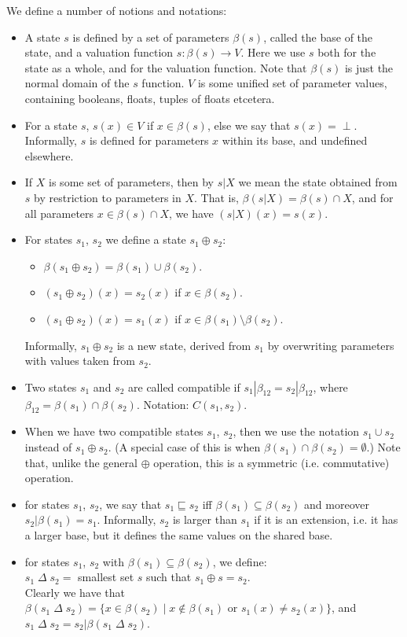 \documentclass[10pt, fleqn]{report}
\begin{document}
 We define a number of notions and notations:
 \begin{itemize}
 \item A state $s$ is defined by a set of parameters $\beta(s)$, called the base of the state,
 and a valuation function $s: \beta(s) \rightarrow V$. Here we use $s$ both for the state as a whole, and for the valuation function. Note that $\beta(s)$ is just the normal domain of the $s$ function.
  $V$ is some unified set of parameter values, containing booleans, floats, tuples of floats etcetera.
  \item For a state $s$, $s(x) \in V$ if $x\in\beta(s)$, else we say that $s(x) = \perp$.
  Informally, $s$ is defined for parameters $x$ within its base, and undefined elsewhere.
  \item If $X$ is some set of parameters, then by $s|X$ we mean the state obtained from $s$ by restriction to parameters in $X$. That is, $\beta(s|X) = \beta(s)\cap X$, and for all
      parameters $x\in \beta(s)\cap X$, we have $(s|X)(x) = s(x)$.
  \item For states $s_1$, $s_2$ we define a state $s_1\oplus s_2$:
  \begin{itemize}
  \item $\beta(s_1\oplus s_2) = \beta(s_1) \cup \beta(s_2)$.
  \item $(s_1\oplus s_2)(x) = s_2(x)$ if $x\in \beta(s_2)$.
  \item $(s_1\oplus s_2)(x) = s_1(x)$ if $x\in \beta(s_1)\setminus \beta(s_2)$.
  \end{itemize}
  Informally, $s_1\oplus s_2$ is a new state, derived from $s_1$ by overwriting parameters
  with values taken from $s_2$.
  \item Two states $s_1$ and $s_2$ are called compatible if $s_1|\beta_{12} = s_2|\beta_{12}$,
  where $\beta_{12} = \beta(s_1)\cap\beta(s_2)$. Notation: $C(s_1,s_2)$.
  \item When we have two compatible states $s_1$, $s_2$,
  then we use the notation $s_1\cup s_2$ instead of $s_1\oplus s_2$.
  (A special case of this is when $\beta(s_1)\cap \beta(s_2) = \emptyset.$)
  Note that, unlike the general $\oplus$ operation, this is a symmetric (i.e. commutative) operation.

  \item for states $s_1$, $s_2$, we say that $s_1 \sqsubseteq s_2$ iff
  $\beta(s_1) \subseteq \beta(s_2)$ and moreover $s_2|\beta(s_1) = s_1$.
  Informally, $s_2$ is larger than $s_1$ if it is an extension, i.e. it has a larger base,
  but it defines the same values on the shared base.
  \item for states $s_1$, $s_2$ with $\beta(s_1)\subseteq \beta(s_2)$, we define:\\
  $s_1\;\Delta\; s_2 = $ smallest set $s$ such that $s_1\oplus s = s_2$.\\
  Clearly we have that $\beta(s_1\;\Delta\; s_2) = \{x\in \beta(s_2)\;|\; x\not\in \beta(s_1) \textrm{ or } s_1(x) \neq s_2(x) \}$, and $s_1\;\Delta\; s_2 = s_2|\beta(s_1\;\Delta\; s_2)$.
 \end{itemize}
\end{document}
